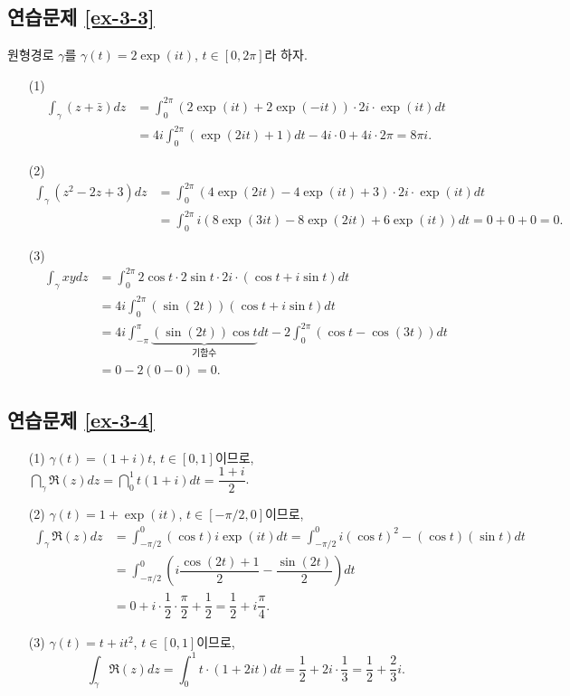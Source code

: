 \subsection*{연습문제 \ref{ex-3-3}}

원형경로 $\gamma$를 $\gamma(t) = 2\exp(it)$, $t\in[0,2\pi]$라 하자.
\begin{itemize}
\item[(1)] 
\begin{align*}
\int_\gamma (z+\bar z) dz & = \int_0^{2\pi} (2\exp(it) + 2\exp(-it))\cdot 2i \cdot \exp(it) dt \\
&= 4i\int_0^{2\pi} (\exp(2it) +1)dt - 4i\cdot 0 + 4i\cdot 2\pi = 8\pi i.
\end{align*}
\item[(2)] 
\begin{align*}
\int_\gamma (z^2-2z+3) dz & = \int_0^{2\pi} (4\exp(2it) - 4\exp(it)+3)\cdot 2i \cdot \exp(it) dt \\
&= \int_0^{2\pi} i(8\exp(3it) - 8\exp(2it) + 6\exp(it))dt  = 0+0+0 =0.
\end{align*}
\item[(3)] 
\begin{align*}
\int_\gamma xy dz & = \int_0^{2\pi}  2\cos t\cdot 2\sin t \cdot 2i \cdot(\cos t +i\sin t) dt \\
&= 4i\int_0^{2\pi} (\sin (2t))(\cos t + i\sin t)dt \\
&= 4i\int_{-\pi}^\pi \underbrace{(\sin(2t))\cos t}_{\text{기함수}} dt
- 2\int_0^{2\pi} (\cos t - \cos(3t))dt \\
&=0 - 2(0-0) = 0.
\end{align*}
\end{itemize}

\subsection*{연습문제 \ref{ex-3-4}}

\begin{itemize}
\item[(1)] $\gamma(t) =(1+i)t$, $t\in[0,1]$이므로,
$\dint_\gamma \Re(z)dz = \dint_0^1 t(1+i)dt = \dfrac{1+i}2$. 
\item[(2)] $\gamma(t) =1+\exp(it)$, $t\in[-\pi/2,0]$이므로, 
\begin{align*}
\int_\gamma \Re(z) dz &= \int_{-\pi/2}^0 (\cos t)i\exp(it)dt
= \int_{-\pi/2}^0 i(\cos t)^2 -(\cos t)(\sin t)dt \\
&= \int_{-\pi/2}^0 \left( i\dfrac{\cos(2t)+1}2 - \dfrac{\sin(2t)}2 \right) dt \\
&= 0 + i\cdot \dfrac12 \cdot \dfrac \pi2 + \dfrac12 = \dfrac12 + i\dfrac\pi4.
\end{align*}
\item[(3)] $\gamma(t) =t+it^ 2$, $t\in[0,1]$이므로,
\[
\int_\gamma \Re(z) dz  = \int_0^1 t\cdot(1+2it)dt = \dfrac12 + 2i\cdot\dfrac13 
=\dfrac12 + \dfrac23i.
\]
\end{itemize}

